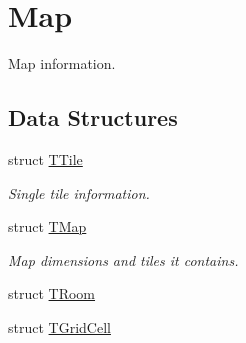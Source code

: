\hypertarget{group__Map}{}\section{Map}
\label{group__Map}


Map information.  


\subsection*{Data Structures}
\begin{DoxyCompactItemize}
\item 
struct \mbox{\hyperlink{structTTile}{T\+Tile}}
\begin{DoxyCompactList}\small\item\em Single tile information. \end{DoxyCompactList}\item 
struct \mbox{\hyperlink{structTMap}{T\+Map}}
\begin{DoxyCompactList}\small\item\em Map dimensions and tiles it contains. \end{DoxyCompactList}\item 
struct \mbox{\hyperlink{structTRoom}{T\+Room}}
\item 
struct \mbox{\hyperlink{structTGridCell}{T\+Grid\+Cell}}
\end{DoxyCompactItemize}
